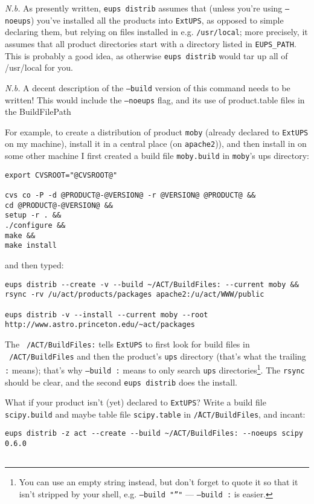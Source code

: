 \documentclass{article}
\newcommand{\code}[1]{\texttt{#1}}
\newcommand{\eups}{\code{ExtUPS}}
\begin{document}
\begin{itemize}
\textit{N.b.} As presently written, \code{eups distrib} assumes that (unless you're
using \code{--noeups}) you've
installed all the products into \eups, as opposed to simple declaring them, but
relying on files installed in e.g. \code{/usr/local}; more precisely, it assumes
that all product directories start with a directory listed in \code{EUPS\_PATH}.
This is probably a good idea, as otherwise \code{eups distrib} would tar up
all of /usr/local for you.  

\textit{N.b.} A decent description of the \code{--build} version of this command
needs to be written!  This would include the \code{--noeups} flag, and its use
of product.table files in the BuildFilePath

For example, to create a distribution of product \code{moby} (already declared
to \eups{} on my machine), install it in a central place (on \code{apache2})),
and then install in on some other machine I first created a build file
\code{moby.build} in \code{moby}'s ups directory:
\begin{verbatim}
export CVSROOT="@CVSROOT@"

cvs co -P -d @PRODUCT@-@VERSION@ -r @VERSION@ @PRODUCT@ &&
cd @PRODUCT@-@VERSION@ &&
setup -r . &&
./configure &&
make &&
make install
\end{verbatim}
and then typed:
\begin{verbatim}
eups distrib --create -v --build ~/ACT/BuildFiles: --current moby &&
rsync -rv /u/act/products/packages apache2:/u/act/WWW/public

eups distrib -v --install --current moby --root http://www.astro.princeton.edu/~act/packages
\end{verbatim}
The \code{~/ACT/BuildFiles:} tells \eups{} to first look for build files
in \code{~/ACT/BuildFiles} and then the product's \code{ups} directory (that's what
the trailing \code{:} means); that's why \code{--build :} means to only search \code{ups}
directories\footnote{
  You can use an empty string instead, but don't forget to quote it so that it isn't
  stripped by your shell, e.g. \code{--build "''"} --- \code{--build :} is easier.
  }. The \code{rsync} should be clear, and the second
\code{eups distrib} does the install.

What if your product isn't (yet) declared to \eups?  Write a build file \code{scipy.build} and
maybe table file \code{scipy.table} in \code{\~/ACT/BuildFiles}, and incant:
\begin{verbatim}
eups distrib -z act --create --build ~/ACT/BuildFiles: --noeups scipy 0.6.0


\end{verbatim}
\end{itemize}
\end{document}
